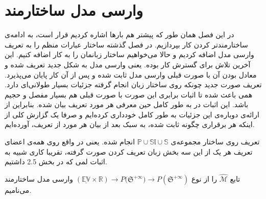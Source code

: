 \chapter{وارسی مدل ساختارمند}

در این فصل همان طور که پیشتر هم بارها اشاره کردیم قرار است، به ادامه‌ی ساختارمندتر کردن کار بپردازیم. در فصل گذشته ساختار عبارات منظم را به تعریف وارسی مدل اضافه کردیم و حالا می‌خواهیم ساختار زبانمان را به کار اضافه کنیم. این آخرین تلاش \cite{calcul} برای گسترش کار بوده. یعنی وارسی مدل به شکل جدید تعریف شده و معادل بودن آن با صورت قبلی وارسی مدل ثابت شده و پس از آن کار پایان می‌پذیرد. 
تعریف صورت جدید چونکه روی ساختار زبان انجام گرفته جزئیات بسیار طولانی‌ای دارد. همی باعث شده تا اثبات‌ برابری این صورت با صورت قبلی هم بسیار مفصل و حجیم باشد. این اثبات در \cite{calcul} به طور کامل حین معرفی هر مورد تعریف بیان شده. بنابراین از ارائه‌ی دوباره‌ی این جزئیات به طور کامل خودداری کرده‌ایم و صرفا یک گزارش کلی از اینکه هر برقراری چگونه ثابت شده، به سبک \cite{calcul} بعد از بیان هر مورد از تعریف، آورده‌ایم.

تعریف روی ساختار مجموعه‌ی 
$\mathbb{P \cup Sl \cup S}$
انجام شده. یعنی در واقع روی همه‌ی اعضای تعریف هر یک از این سه بخش زبان تعریف کردن صورت گرفته، تقریبا کاری شبیه به اثبات لمی که در بخش 2.5 داشتیم.

\begin{defn}
	
تابع
$\mathcal{\hat{M}}$
 را از نوع
 $\mathbb{(\underline{EV} \times R)} \rightarrow  \mathit{P}({\mathfrak{S}^{+\infty})}
\rightarrow \mathit{P}(\mathfrak{S}^{+\infty} ) $
وارسی مدل ساختارمند می‌نامیم.
\end{defn}